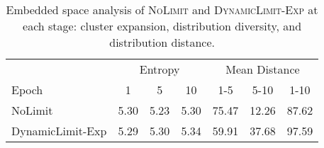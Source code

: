 
\begin{table}[t!]
\centering
\small
\tabcolsep=2.5pt 
\begin{tabular}{lcccccc}
\toprule
       & \multicolumn{3}{c}{Entropy}              & \multicolumn{3}{c}{Mean Distance}        \\ \cmidrule(r){2-4}\cmidrule(r){5-7}
Epoch  & 1     & 5     & 10    & 1-5   & 5-10  & 1-10  \\ \midrule
NoLimit           & 5.30  & 5.23  & 5.30  & 75.47 & 12.26  & 87.62 \\
DynamicLimit-Exp  & 5.29  & 5.30  & 5.34  & 59.91 & 37.68  & 97.59 \\ \bottomrule
\end{tabular}
\caption{Embedded space analysis of \textsc{NoLimit} and \textsc{DynamicLimit-Exp} at each stage: cluster expansion, distribution diversity, and distribution distance.}
\label{tab:cluster_analysis_case}
\end{table}
